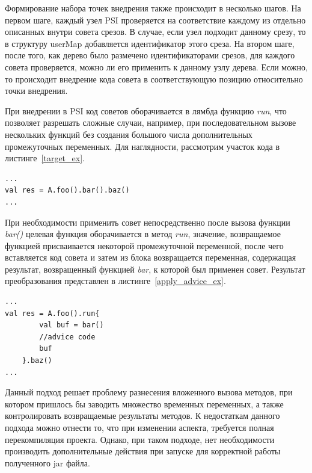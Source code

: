 \documentclass[conference]{IEEEtran}
\begin{document}
Формирование набора точек внедрения также происходит в несколько шагов.
На первом шаге, каждый узел PSI проверяется на соответствие каждому из отдельно
описанных внутри совета срезов.
В случае, если узел подходит данному срезу, то в структуру userMap добавляется
идентификатор этого среза.
На втором шаге, после того, как дерево было размечено идентификаторами срезов, 
для каждого совета проверяется, можно ли его применить к данному узлу дерева.
Если можно, то происходит внедрение кода совета в соответствующую позицию
относительно точки внедрения.

При внедрении в PSI код советов оборачивается в лямбда функцию \textit{run}, что
позволяет разрешать сложные случаи, например, при последовательном вызове
нескольких функций без создания большого числа дополнительных 
промежуточных переменных.
Для наглядности, рассмотрим участок кода в листинге~\ref{target_ex}.
\begin{lstlisting}[label=target_ex,
    caption={Пример целевой точки внедрения}]
...
val res = A.foo().bar().baz()
...
\end{lstlisting}
При необходимости применить совет непосредственно после вызова функции 
\textit{bar()} целевая функция оборачивается в метод \textit{run}, значение, 
возвращаемое функцией присваивается некоторой промежуточной переменной, после 
чего вставляется код совета и затем из блока возвращается переменная, 
содержащая результат, возвращенный функцией \textit{bar}, к которой был применен
совет.
Результат преобразования представлен в листинге~\ref{apply_advice_ex}.
\begin{lstlisting}[label=apply_advice_ex,
    caption={Пример внедрения кода с использованием функции run}]
...
val res = A.foo().run{
        val buf = bar()
        //advice code
        buf
    }.baz()
...
\end{lstlisting}

Данный подход решает проблему разнесения вложенного вызова методов, при котором 
пришлось бы заводить множество временных переменных, а также контролировать 
возвращаемые результаты методов.
К недостаткам данного подхода можно отнести то, что при изменении аспекта,
требуется полная перекомпиляция проекта.
Однако, при таком подходе, нет необходимости производить дополнительные действия
при запуске для корректной работы полученного jar файла.
\end{document}
